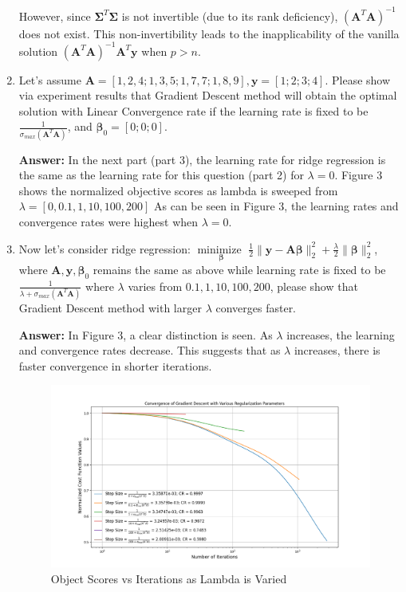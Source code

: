 \documentclass[11pt]{article}
\newcommand{\minimize}{\operatorname*{minimize\ }}
\newcommand{\mtx}[1]{\mathbf{#1}}
\newcommand{\vct}[1]{\mathbf{#1}}
\def \mA {\mtx{A}}
\def \vy {\vct{y}}
\begin{document}
\begin{enumerate}
		However, since \(\mathbf{\Sigma}^T \mathbf{\Sigma}\) is not invertible (due to its rank deficiency), \((\mathbf{A}^T \mathbf{A})^{-1}\) does not exist. This non-invertibility leads to the inapplicability of the vanilla solution \((\mathbf{A}^T \mathbf{A})^{-1} \mathbf{A}^T \mathbf{y}\) when \(p > n\).
		
		\item Let's assume $\mA=[1, 2, 4;1, 3, 5; 1, 7, 7; 1, 8, 9], \vy=[1;2;3;4]$. Please show via experiment results that Gradient Descent method will obtain the optimal solution with  Linear Convergence rate if the learning rate is fixed to be $\frac{1}{\sigma_{max}(\mA^T\mA)}$, and $\bm{\beta}_0=[0;0;0]$.	
		
		\textbf{Answer:}
		In the next part (part 3), the learning rate for ridge regression is the same as the learning rate for this question (part 2) for $\lambda = 0$. Figure 3 shows the normalized objective scores as lambda is sweeped from 
		$\lambda = [0, 0.1, 1, 10, 100, 200]$
		As can be seen in Figure 3, the learning rates and convergence rates were highest when $\lambda = 0$.

		\item Now let's consider ridge regression: $\minimize \limits_{\bm{\beta}} \frac{1}{2}\|\vy-\mA\bm{\beta}\|^2_2+\frac{\lambda}{2} \|\bm{\beta}\|^2_2$, where  $\mA,\vy,\bm{\beta}_0$ remains the same as above while learning rate is fixed to be $\frac{1}{\lambda+\sigma_{max}(\mA^T\mA)}$ where $\lambda$ varies from $0.1,1,10,100,200$, please show that Gradient Descent method with larger $\lambda$ converges faster. 
		
		\textbf{Answer:}
		In Figure 3, a clear distinction is seen. As $\lambda$ increases, the learning and convergence rates decrease. This suggests that as $\lambda$ increases, there is faster convergence in shorter iterations. 

		\begin{figure}[htbp]
    		\centering
    		\includegraphics[width=\textwidth]{figures/hw3_2.png}
    		\caption{Object Scores vs Iterations as Lambda is Varied}
		\label{fig:objective_func_scores}
\end{figure}


	\end{enumerate}
	\newpage
	
\end{document}
